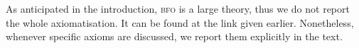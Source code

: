 \documentclass[ao]{iosart2x}
\newcommand{\nb}[1]{\textcolor{red}{$|$}\marginpar{\hspace*{-0cm}\parbox{20mm}{\scriptsize\raggedright\textcolor{red}{#1}}}}
\newcommand{\bflist}{\begin{list}{}{\setlength{\topsep}{2mm}\setlength{\parsep}{0mm}\setlength{\leftmargin}{9.2mm}\setlength{\labelwidth}{8mm}}}
\newcommand{\eflist}{\end{list}}
\newcommand{\bfoAxLabel}{\textrm{a$_\texttt{b}$}}
\newcommand{\bfoDefLabel}{\textrm{d$_\texttt{b}$}}
\newcounter{cntaxb}
\newcommand{\bfoax}[1]{\refstepcounter{cntaxb}\begin{small}{\bf \bfoAxLabel\thecntaxb\label{#1}}\end{small}}
\newcounter{cntdefb}
\newcommand{\bfodf}[1]{\refstepcounter{cntdefb}\begin{small}{\bf \bfoDefLabel\thecntdefb\label{#1}}\end{small}}
\newcounter{cntax}
\newcounter{cntdef}
\newcommand{\refbfoax}[1]{({\bfoAxLabel}\ref{#1})}
\newcommand{\refbfodf}[1]{({\bfoDefLabel}\ref{#1})}
\newcommand{\pr}[1]{\mathtt{#1}}
\newcommand{\cn}[1]{\mathtt{#1}}
\newcommand\textequal{%
 \rule[.08ex]{5pt}{0.35pt}\llap{\rule[.78ex]{5pt}{0.35pt}}}
\newcommand{\sdef}{{\hspace{1.5pt}:\hspace{-2.5pt}\textequal\hspace{3pt}}}
\newcommand{\bfo}{{\textsc{bfo}}}
\newcommand{\bfocl}{{\textsc{bfo-cl}}}
\newcommand {\thbfo} {\ensuremath{\mathfrak{B}}}
\newcommand {\thdolcedbmap} {\ensuremath{\mathfrak{D}_\texttt{b}}}
\newcommand{\idcntbcat}{\cn{idcnt}}
\newcommand{\sdcntbcat}{\cn{sdcnt}}
\newcommand{\sregbcat}{\cn{sreg}}
\newcommand{\tregbcat}{\cn{treg}}
\newcommand{\bfoisa}{\pr{ISA}}
\newcommand{\bfotime}{\textsc{tm}}
\newcommand{\bfocpart}{\pr{cP}}
\newcommand{\bfocoverlap}{\pr{cO}}
\newcommand{\bfoopart}{\pr{oP}}
\newcommand{\bfoooverlap}{\pr{oO}}
\newcommand{\bfotpart}{\pr{tmP}}
\newcommand{\bfotppart}{\pr{tmPP}}
\newcommand{\bfotoverlap}{\pr{tmO}}
\newcommand{\bfoiof}[1]{{\,::_{#1\:\!}}}
\newcommand{\bfoinh}{\pr{INH}}
\newcommand{\bfosdep}{\pr{SDEP}}
\begin{document}
As anticipated in the introduction, {\bfo} is a large theory, thus we do not report the whole axiomatisation. It can be found at the link given earlier. Nonetheless, whenever specific axioms are discussed, we report them explicitly in the text.

% 
%
%
%
%
%
%
%
%
%
\end{document}
